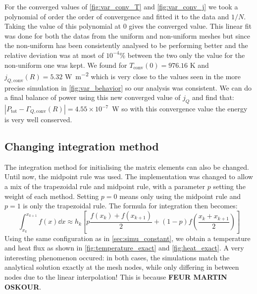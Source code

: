 For the converged values of \autoref{fig:var_conv_T} and \autoref{fig:var_conv_j} we took a polynomial of order the order of convergence and fitted it to the data and $1/N$. Taking the value of this polynomial at $0$ gives the converged value. This linear fit was done for both the datas from the uniform and non-uniform meshes but since the non-uniform has been consistently analysed to be performing better and the relative deviation was at most of $10^{-4}$\% between the two only the value for the non-uniform one was kept. We found for $T_\mathrm{conv}(0) = 976.16$ \si{\kelvin} and $j_{Q,\mathrm{conv}}(R) = 5.32$ \si{\watt\per\meter\squared} which is very close to the values seen in the more precise simulation in \autoref{fig:var_behavior} so our analysis was consistent. We can do a final balance of power using this new converged value of $j_Q$ and find that: \hbox{$|P_\mathrm{tot} - \Gamma_{Q,\mathrm{conv}}(R)| = 4.55 \times 10^{-7}$ \si{\watt}} so with this convergence value the energy is very well conserved.

\subsection{Changing integration method}

The integration method for initialising the matrix elements can also be changed. Until now, the midpoint rule was used. The implementation was changed to allow a mix of the trapezoidal rule and midpoint rule, with a parameter \(p\) setting the weight of each method. Setting \(p = 0\) means only using the midpoint rule and \(p = 1\) is only the trapezoidal rule. The formula for integration then becomes:
\begin{equation}
    \int_{x_k}^{x_{k+1}} f(x) \dd x \approx h_k \left[ p \frac{f(x_k) + f(x_{k+1})}{2} + (1-p) f \left( \frac{x_k + x_{k+1}}{2} \right) \right]
\end{equation}
Using the same configuration as in \autoref{sec:simu_constant}, we obtain a temperature and heat flux as shown in \autoref{fig:temperature_exact} and \autoref{fig:heat_exact}. A very interesting phenomenon occured: in both cases, the simulations match the analytical solution exactly at the mesh nodes, while only differing in between nodes due to the linear interpolation! This is because \textbf{FEUR MARTIN OSKOUR}.

